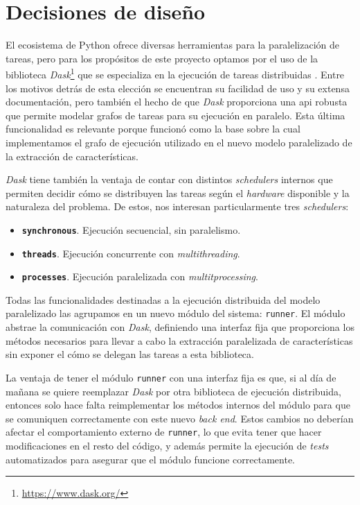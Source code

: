 \section{Decisiones de diseño}

El ecosistema de Python ofrece diversas herramientas para la paralelización de tareas, pero para los propósitos de este proyecto optamos por el uso de la biblioteca \emph{Dask}\footnote{\url{https://www.dask.org/}} que se especializa en la ejecución de tareas distribuidas \citep{rocklin2015dask}. Entre los motivos detrás de esta elección se encuentran su facilidad de uso y su extensa documentación, pero también el hecho de que \emph{Dask} proporciona una \gls{api} robusta que permite modelar grafos de tareas para su ejecución en paralelo. Esta última funcionalidad es relevante porque funcionó como la base sobre la cual implementamos el grafo de ejecución utilizado en el nuevo modelo paralelizado de la extracción de características.

\emph{Dask} tiene también la ventaja de contar con distintos \emph{schedulers} internos que permiten decidir cómo se distribuyen las tareas según el \emph{hardware} disponible y la naturaleza del problema. De estos, nos interesan particularmente tres \emph{schedulers}:

\begin{itemize}
    \item \textbf{\texttt{synchronous}}. Ejecución secuencial, sin paralelismo.
    \item \textbf{\texttt{threads}}. Ejecución concurrente con \emph{multithreading}.
    \item \textbf{\texttt{processes}}. Ejecución paralelizada con \emph{multitprocessing}.
\end{itemize}

Todas las funcionalidades destinadas a la ejecución distribuida del modelo paralelizado las agrupamos en un nuevo módulo del sistema: \texttt{runner}. El módulo abstrae la comunicación con \emph{Dask}, definiendo una interfaz fija que proporciona los métodos necesarios para llevar a cabo la extracción paralelizada de características sin exponer el cómo se delegan las tareas a esta biblioteca.

La ventaja de tener el módulo \texttt{runner} con una interfaz fija es que, si al día de mañana se quiere reemplazar \emph{Dask} por otra biblioteca de ejecución distribuida, entonces solo hace falta reimplementar los métodos internos del módulo para que se comuniquen correctamente con este nuevo \emph{back end}. Estos cambios no deberían afectar el comportamiento externo de \texttt{runner}, lo que evita tener que hacer modificaciones en el resto del código, y además permite la ejecución de \emph{tests} automatizados para asegurar que el módulo funcione correctamente.